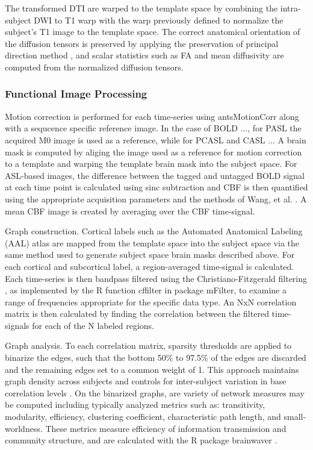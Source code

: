 The transformed DTI are warped to the template space by combining the intra-subject DWI to T1 warp with the warp previously defined to normalize the subject's T1 image to the template space. The correct anatomical orientation of the diffusion tensors is preserved by applying the preservation of principal direction method \cite{Alexander2001}, and scalar statistics such as FA and mean diffusivity are computed from the normalized diffusion tensors.


\subsubsection{Functional Image Processing}

Motion correction is performed for each time-series using
antsMotionCorr along with a sequcence specific reference image. In
the case of BOLD ..., for PASL the acquired M0 image is used as a
reference, while for PCASL and CASL ... A brain mask is computed by
aliging the image used as a reference for motion correction to a
template and warping the template brain mask into the subject
space. For ASL-based images, the difference between the tagged and
untagged BOLD signal at each time point is calculated using sinc subtraction \cite{Aguirre2002} and CBF is
then quantified using the appropriate acquisition parameters and the
methods of Wang, et al. \cite{Wang2003}. A mean CBF image is created by
averaging over the CBF time-signal. 

Graph construction. Cortical labels such as the Automated Anatomical
Labeling (AAL) atlas \cite{Tzourio-Mazoyer2002} are mapped from
the template space into the subject space via the same method used to
generate subject space brain masks described above. For each cortical
and subcortical label, a region-averaged time-signal is
calculated. Each time-series is then bandpass filtered using the
Christiano-Fitzgerald filtering \cite{Christiano2003}, as
implemented by the R function cffilter in package mFilter, to examine
a range of frequencies appropriate for the specific data type. An NxN
correlation matrix is then calculated by finding the correlation
between the filtered time-signals for each of the N labeled regions.

Graph analysis. To each correlation matrix, sparsity thresholds are
applied to binarize the edges, such that the bottom 50\% to 97.5\% of
the edges are discarded and the remaining edges set to a common
weight of 1.  This approach maintains graph density across subjects
and controls for inter-subject variation in base correlation levels
\cite{Liu2008, Power2011, Schwarz2011, Braun2012, Liang2012}. 
On the binarized graphs, are variety of network measures may be
computed including typically analyzed metrics such as: transitivity,
modularity, efficiency, clustering coefficient, characteristic path
length, and small-worldness. These metrics measure efficiency of
information transmission and community structure, and are calculated
with the R package brainwaver \cite{Achard2006}.

